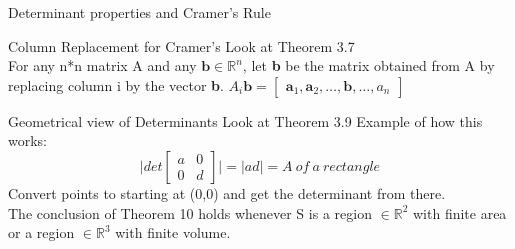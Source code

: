 \documentclass[a4paper, 12pt]{article}
\begin{document}
\begin{section}{Determinant properties and Cramer's Rule}
\begin{subsection}{Column Replacement for Cramer's}
Look at Theorem 3.7\\
For any n*n matrix A and any $\textbf{b}\in\mathbb{R}^{n}$, let
\textbf{b} be the matrix obtained from A by replacing column i by the 
vector \textbf{b}.
$A_{i}\textbf{b}=\begin{bmatrix} \textbf{a}_{1}, \textbf{a}_{2},\dots,
\textbf{b},\dots, a_{n} \end{bmatrix}$
\end{subsection}
\begin{subsection}{Geometrical view of Determinants}
Look at Theorem 3.9
Example of how this works:
\begin{equation}
\lvert det\begin{bmatrix} a&0\\0&d \end{bmatrix} \rvert = 
\lvert ad \rvert = A~of~a~rectangle
\end{equation}
Convert points to starting at (0,0) and get the determinant from there. \\
The conclusion of Theorem 10 holds whenever S is a region $\in\mathbb{R}^2$
with finite area or a region $\in\mathbb{R}^{3}$ with finite volume. \\

\end{subsection}
\end{section}
\newpage
\end{document}

